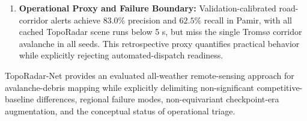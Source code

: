 \begin{enumerate}
    \item \textbf{Operational Proxy and Failure Boundary:} Validation-calibrated road-corridor alerts achieve $83.0\%$ precision and $62.5\%$ recall in Pamir, with all cached TopoRadar scene runs below 5 s, but miss the single Troms{\o} corridor avalanche in all seeds. This retrospective proxy quantifies practical behavior while explicitly rejecting automated-dispatch readiness.
\end{enumerate}

TopoRadar-Net provides an evaluated all-weather remote-sensing approach for avalanche-debris mapping while explicitly delimiting non-significant competitive-baseline differences, regional failure modes, non-equivariant checkpoint-era augmentation, and the conceptual status of operational triage.
